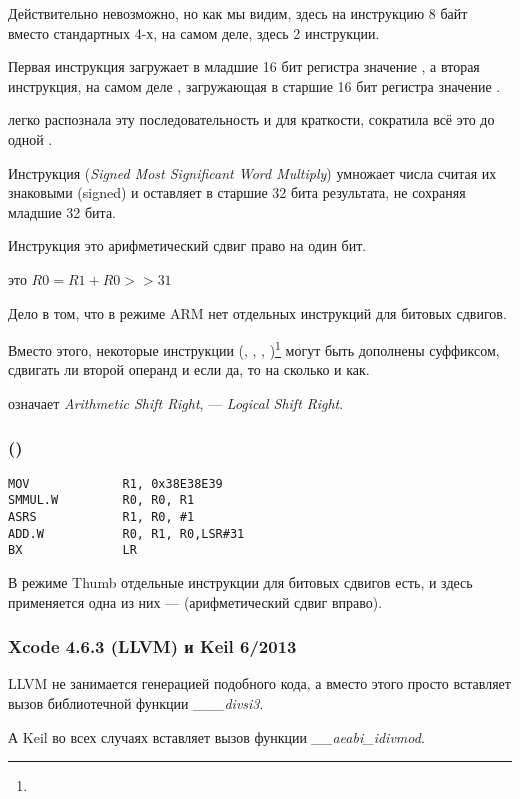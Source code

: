 Действительно невозможно, но как мы видим, здесь на инструкцию 8 байт вместо стандартных 4-х,
на самом деле, здесь 2 инструкции.

Первая инструкция загружает в младшие 16 бит регистра значение , а вторая инструкция, 
на самом деле , загружающая в старшие 16 бит регистра значение .

\IDA легко распознала эту последовательность и для краткости, сократила всё это до одной .

Инструкция  (\emph{Signed Most Significant Word Multiply}) 
умножает числа считая их знаковыми (signed) и оставляет в  старшие 32 бита результата, 
не сохраняя младшие 32 бита.

Инструкция это арифметический сдвиг право на один бит.

 это $R0=R1 + R0>>31$

\label{shifts_in_ARM_mode}
Дело в том, что в режиме ARM нет отдельных инструкций для битовых сдвигов.

Вместо этого, некоторые инструкции 
(\MOV, \ADD, \SUB, )\footnote{\DataProcessingInstructionsFootNote}
могут быть дополнены суффиксом, сдвигать ли второй операнд и если да, то на сколько и как.

 означает \emph{Arithmetic Shift Right},  --- \emph{Logical Shift Right}.

\subsubsection{\OptimizingXcodeIV (\ThumbTwoMode)}

\begin{lstlisting}[style=customasmARM]
MOV             R1, 0x38E38E39
SMMUL.W         R0, R0, R1
ASRS            R1, R0, #1
ADD.W           R0, R1, R0,LSR#31
BX              LR
\end{lstlisting}

В режиме Thumb отдельные инструкции для битовых сдвигов есть, и здесь применяется одна из них --- 
(арифметический сдвиг вправо).

\subsubsection{\NonOptimizing Xcode 4.6.3 (LLVM) и Keil 6/2013}

\NonOptimizing LLVM 
не занимается генерацией подобного кода, а вместо этого просто вставляет вызов
библиотечной функции \emph{\_\_\_divsi3}.

А Keil во всех случаях вставляет вызов функции \emph{\_\_aeabi\_idivmod}.
